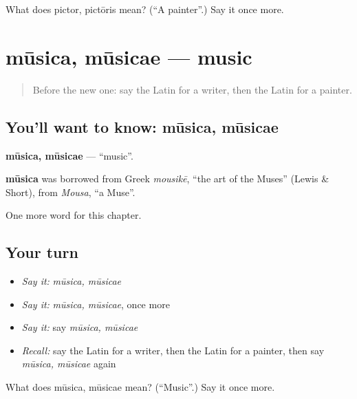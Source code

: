 \begin{tcolorbox}[breakable,colback=teal!4,colframe=teal!35!black,title={Before you move on}]
What does pictor, pictōris mean? (\textquotedblleft{}A painter\textquotedblright{}.) Say it once more.
\end{tcolorbox}
\section[mūsica, mūsicae]{mūsica, mūsicae — music}

\label{lesson:LA-C246-musica}



\begin{quote}
Before the new one: say the Latin for a writer, then the Latin for a painter.
\end{quote}

\subsection*{You'll want to know: mūsica, mūsicae}
\textbf{mūsica, mūsicae} — \textquotedblleft{}music\textquotedblright{}.

\begin{cousinweb}
\textbf{mūsica} was borrowed from Greek \emph{mousikē}, \textquotedblleft{}the art of the Muses\textquotedblright{} (Lewis \& Short), from \emph{Mousa}, \textquotedblleft{}a Muse\textquotedblright{}.
\end{cousinweb}

\begin{grammarlens}[title={What you've built}]
One more word for this chapter.
\end{grammarlens}

\subsection*{Your turn}
\begin{itemize}
\raggedright
  \item \emph{Say it:} \emph{mūsica, mūsicae}
  \item \emph{Say it:} \emph{mūsica, mūsicae}, once more
  \item \emph{Say it:} say \emph{mūsica, mūsicae}
  \item \emph{Recall:} say the Latin for a writer, then the Latin for a painter, then say \emph{mūsica, mūsicae} again
\end{itemize}

\begin{tcolorbox}[breakable,colback=teal!4,colframe=teal!35!black,title={Before you move on}]
What does mūsica, mūsicae mean? (\textquotedblleft{}Music\textquotedblright{}.) Say it once more.
\end{tcolorbox}
